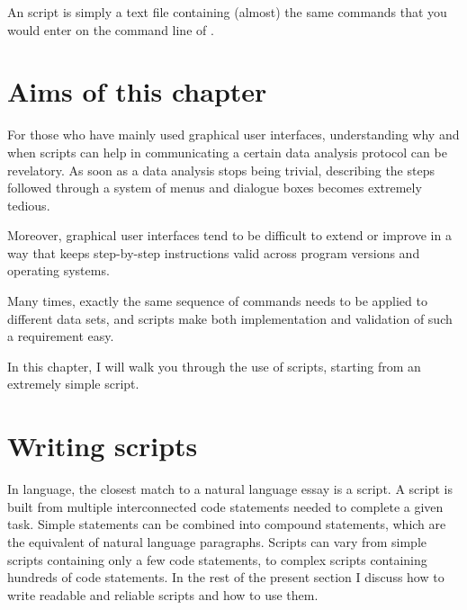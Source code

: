\documentclass[krantz2]{krantz}\usepackage{knitr}
\newcommand{\href}[2]{\emph{#2} (\url{#1})}
\begin{document}
\begin{VF}
An \Rlang script is simply a text file containing (almost) the same commands that you would enter on the command line of \Rlang.

\nocite{LemonND}
\end{VF}


\section{Aims of this chapter}

For those who have mainly used graphical user interfaces, understanding why and when scripts can help in communicating a certain data analysis protocol can be revelatory. As soon as a data analysis stops being trivial, describing the steps followed through a system of menus and dialogue boxes becomes extremely tedious.

Moreover, graphical user interfaces tend to be difficult to extend or improve in a way that keeps step-by-step instructions valid across program versions and operating systems.

Many times, exactly the same sequence of commands needs to be applied to different data sets, and scripts make both implementation and validation of such a requirement easy.

In this chapter, I will walk you through the use of \Rpgrm scripts, starting from an extremely simple script.

\section{Writing scripts}

In \Rlang language, the closest match to a natural language essay is a script. A script is built from multiple interconnected code statements needed to complete a given task. Simple statements can be combined into compound statements, which are the equivalent of natural language paragraphs. Scripts can vary from simple scripts containing only a few code statements, to complex scripts containing hundreds of code statements. In the rest of the present section I discuss how to write readable and reliable scripts and how to use them.
\end{document}

